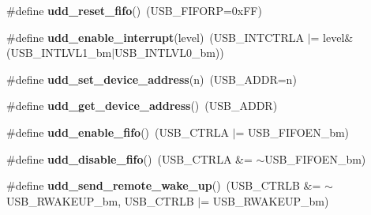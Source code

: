 \begin{DoxyCompactItemize}
\item 
\hypertarget{group__udd__xmega__usb__group_ga6b540b640f84b387740c0def675210b0}{\#define {\bfseries udd\-\_\-reset\-\_\-fifo}()~(U\-S\-B\-\_\-\-F\-I\-F\-O\-R\-P=0x\-F\-F)}\label{group__udd__xmega__usb__group_ga6b540b640f84b387740c0def675210b0}

\item 
\hypertarget{group__udd__xmega__usb__group_gac38126f95f98fb850f4e82bd69331fc9}{\#define {\bfseries udd\-\_\-enable\-\_\-interrupt}(level)~(U\-S\-B\-\_\-\-I\-N\-T\-C\-T\-R\-L\-A $|$= level\&(U\-S\-B\-\_\-\-I\-N\-T\-L\-V\-L1\-\_\-bm$|$U\-S\-B\-\_\-\-I\-N\-T\-L\-V\-L0\-\_\-bm))}\label{group__udd__xmega__usb__group_gac38126f95f98fb850f4e82bd69331fc9}

\item 
\hypertarget{group__udd__xmega__usb__group_ga41192c7b538bdfbf244176716b7958e0}{\#define {\bfseries udd\-\_\-set\-\_\-device\-\_\-address}(n)~(U\-S\-B\-\_\-\-A\-D\-D\-R=n)}\label{group__udd__xmega__usb__group_ga41192c7b538bdfbf244176716b7958e0}

\item 
\hypertarget{group__udd__xmega__usb__group_ga8f71bf0f43c8322c5eb7b3ece6f6696e}{\#define {\bfseries udd\-\_\-get\-\_\-device\-\_\-address}()~(U\-S\-B\-\_\-\-A\-D\-D\-R)}\label{group__udd__xmega__usb__group_ga8f71bf0f43c8322c5eb7b3ece6f6696e}

\item 
\hypertarget{group__udd__xmega__usb__group_gaead26d93692eadfa10d2cd816ebbc446}{\#define {\bfseries udd\-\_\-enable\-\_\-fifo}()~(U\-S\-B\-\_\-\-C\-T\-R\-L\-A $|$= U\-S\-B\-\_\-\-F\-I\-F\-O\-E\-N\-\_\-bm)}\label{group__udd__xmega__usb__group_gaead26d93692eadfa10d2cd816ebbc446}

\item 
\hypertarget{group__udd__xmega__usb__group_ga4e2827241d29a454ded324e10208c200}{\#define {\bfseries udd\-\_\-disable\-\_\-fifo}()~(U\-S\-B\-\_\-\-C\-T\-R\-L\-A \&= $\sim$U\-S\-B\-\_\-\-F\-I\-F\-O\-E\-N\-\_\-bm)}\label{group__udd__xmega__usb__group_ga4e2827241d29a454ded324e10208c200}

\item 
\hypertarget{group__udd__xmega__usb__group_ga0f041fe28778b1bc69d9829295b5c76a}{\#define {\bfseries udd\-\_\-send\-\_\-remote\-\_\-wake\-\_\-up}()~(U\-S\-B\-\_\-\-C\-T\-R\-L\-B \&= $\sim$U\-S\-B\-\_\-\-R\-W\-A\-K\-E\-U\-P\-\_\-bm, U\-S\-B\-\_\-\-C\-T\-R\-L\-B $|$= U\-S\-B\-\_\-\-R\-W\-A\-K\-E\-U\-P\-\_\-bm)}\label{group__udd__xmega__usb__group_ga0f041fe28778b1bc69d9829295b5c76a}


\end{DoxyCompactItemize}
